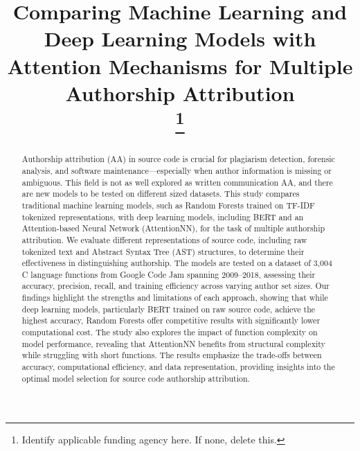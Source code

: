 \documentclass[conference]{IEEEtran}
\begin{document}
\title{Comparing Machine Learning and Deep Learning Models with Attention Mechanisms for Multiple Authorship Attribution\\
\thanks{Identify applicable funding agency here. If none, delete this.}
}

\author{
\and
{}
}

\maketitle

\begin{abstract}
Authorship attribution (AA) in source code is crucial for plagiarism detection, forensic analysis, and software maintenance—especially when author information is missing or ambiguous. This field is not as well explored as written communication AA, and there are new models to be tested on different sized datasets. This study compares traditional machine learning models, such as Random Forests trained on TF-IDF tokenized representations, with deep learning models, including BERT and an Attention-based Neural Network (AttentionNN), for the task of multiple authorship attribution. We evaluate different representations of source code, including raw tokenized text and Abstract Syntax Tree (AST) structures, to determine their effectiveness in distinguishing authorship. The models are tested on a dataset of 3,004 C language functions from Google Code Jam spanning 2009--2018, assessing their accuracy, precision, recall, and training efficiency across varying author set sizes. Our findings highlight the strengths and limitations of each approach, showing that while deep learning models, particularly BERT trained on raw source code, achieve the highest accuracy, Random Forests offer competitive results with significantly lower computational cost. The study also explores the impact of function complexity on model performance, revealing that AttentionNN benefits from structural complexity while struggling with short functions. The results emphasize the trade-offs between accuracy, computational efficiency, and data representation, providing insights into the optimal model selection for source code authorship attribution.
\end{abstract}
\end{document}
